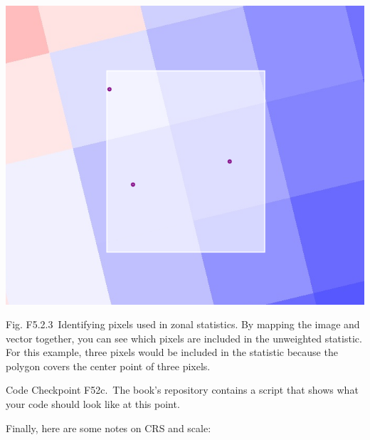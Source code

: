 \documentclass[
  letterpaper,
  DIV=11,
  numbers=noendperiod]{scrreprt}
\begin{document}
\includegraphics{./F5/image44.png}

Fig. F5.2.3~Identifying pixels used in zonal statistics. By mapping the
image and vector together, you can see which pixels are included in the
unweighted statistic. For this example, three pixels would be included
in the statistic because the polygon covers the center point of three
pixels.

\begin{tcolorbox}[enhanced jigsaw, left=2mm, breakable, rightrule=.15mm, opacityback=0, colframe=quarto-callout-note-color-frame, colbacktitle=quarto-callout-note-color!10!white, arc=.35mm, opacitybacktitle=0.6, toptitle=1mm, colback=white, leftrule=.75mm, title=\textcolor{quarto-callout-note-color}{\faInfo}\hspace{0.5em}{Note}, toprule=.15mm, bottomtitle=1mm, titlerule=0mm, bottomrule=.15mm, coltitle=black]

Code Checkpoint F52c.~The book's repository contains a script that shows
what your code should look like at this point.

\end{tcolorbox}

Finally, here are some notes on CRS and scale:
\end{document}
